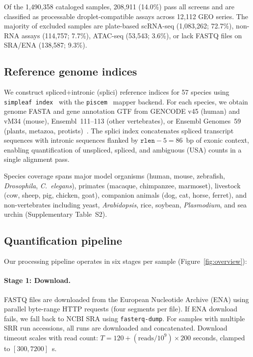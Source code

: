 \documentclass[10pt,twocolumn,letterpaper]{article}
\begin{document}
Of the 1,490,358 cataloged samples, 208,911 (14.0\%) pass all screens and
are classified as processable droplet-compatible assays across 12,112 GEO
series. The majority of excluded samples are plate-based scRNA-seq
(1,083,262; 72.7\%), non-RNA assays (114,757; 7.7\%), ATAC-seq
(53,543; 3.6\%), or lack FASTQ files on SRA/ENA (138,587; 9.3\%).

\subsection{Reference genome indices}

We construct spliced+intronic (splici) reference indices for 57
species using \texttt{simpleaf index}~\citep{he2022} with the
\texttt{piscem}~\citep{patro2023} mapper backend. For each species, we
obtain genome FASTA and gene annotation GTF from GENCODE v45 (human) and
vM34 (mouse), Ensembl~111--113 (other vertebrates), or Ensembl Genomes~59
(plants, metazoa, protists)~\citep{cunningham2022}. The splici index
concatenates spliced transcript sequences with intronic sequences flanked
by $\texttt{rlen} - 5 = 86$~bp of exonic context, enabling quantification
of unspliced, spliced, and ambiguous (USA) counts in a single alignment pass.

Species coverage spans major model organisms (human, mouse, zebrafish,
\textit{Drosophila}, \textit{C.~elegans}), primates (macaque, chimpanzee,
marmoset), livestock (cow, sheep, pig, chicken, goat), companion animals
(dog, cat, horse, ferret), and non-vertebrates including yeast, \textit{Arabidopsis},
rice, soybean, \textit{Plasmodium}, and sea urchin
(Supplementary Table~S2).

\subsection{Quantification pipeline}
\label{sec:pipeline}

Our processing pipeline operates in six stages per sample (Figure~\ref{fig:overview}):

\paragraph{Stage 1: Download.} FASTQ files are downloaded from the European
Nucleotide Archive (ENA) using parallel byte-range HTTP requests (four
segments per file). If ENA download fails, we fall back to NCBI SRA using
\texttt{fasterq-dump}. For samples with multiple SRR run accessions, all
runs are downloaded and concatenated. Download timeout scales with read
count: $T = 120 + (\text{reads}/10^9) \times 200$ seconds, clamped to
$[300, 7200]$~s.
\end{document}
